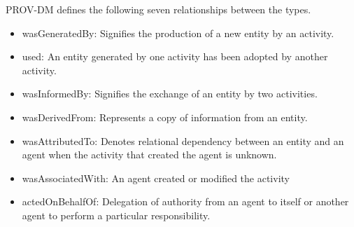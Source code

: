 \documentclass[conference]{IEEEtran}
\begin{document}
\par PROV-DM defines the following seven relationships between the types. 

\begin{itemize}
\item wasGeneratedBy:  Signifies the production of a new entity by an activity. 

\item used: An entity generated by one activity has been adopted by another activity.

\item wasInformedBy: Signifies the exchange of an entity by two activities.

\item wasDerivedFrom: Represents a copy of information from an entity. 

\item wasAttributedTo: Denotes relational dependency between an entity and an agent when the activity that created the agent is unknown.

\item wasAssociatedWith: An agent created or modified the activity

\item actedOnBehalfOf: Delegation of authority from an agent to itself or another agent to perform a particular responsibility. 



\end{itemize}



%
%
\end{document}
